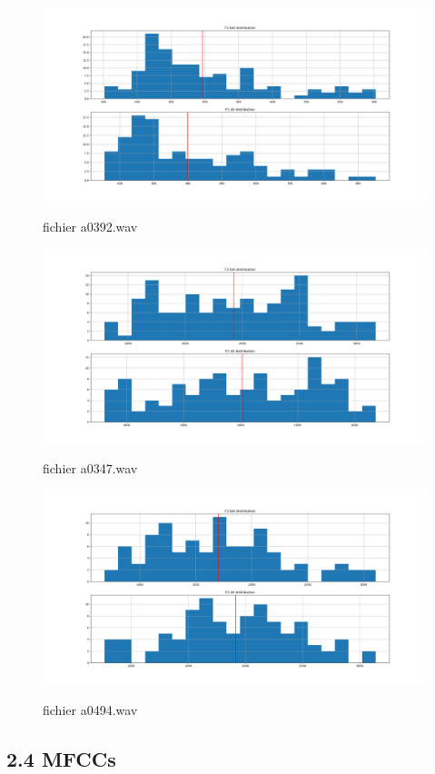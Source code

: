 \documentclass[a4paper,12pt]{report}	%
\begin{document}
\begin{figure}[H]
	\centering
	{\includegraphics[scale=0.35]{figures/F1_distr_a0392.png}}
	\caption{fichier a0392.wav} 
\end{figure}
\begin{figure}[H]
	{\includegraphics[scale=0.35]{figures/F2_distr_a347.png}}
	\caption{fichier a0347.wav} 
\end{figure}
\begin{figure}[H]
	\centering
	{\includegraphics[scale=0.35]{figures/F2_distr_a494.png}}
	\caption{fichier a0494.wav} 
\end{figure}
{\subsection*{2.4 MFCCs}}
\end{document}
